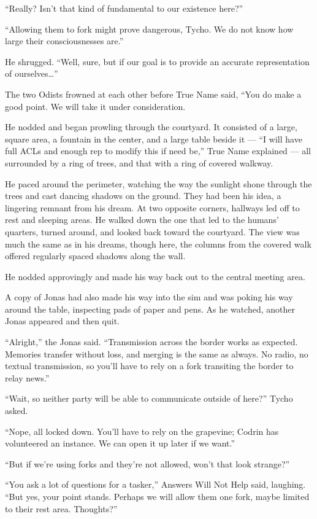 ``Really? Isn't that kind of fundamental to our existence here?''

``Allowing them to fork might prove dangerous, Tycho. We do not know how large their consciousnesses are.''

He shrugged. ``Well, sure, but if our goal is to provide an accurate representation of ourselves\ldots{}''

The two Odists frowned at each other before True Name said, ``You do make a good point. We will take it under consideration.

He nodded and began prowling through the courtyard. It consisted of a large, square area, a fountain in the center, and a large table beside it — ``I will have full ACLs and enough rep to modify this if need be,'' True Name explained — all surrounded by a ring of trees, and that with a ring of covered walkway.

He paced around the perimeter, watching the way the sunlight shone through the trees and cast dancing shadows on the ground. They had been his idea, a lingering remnant from his dream. At two opposite corners, hallways led off to rest and sleeping areas. He walked down the one that led to the humans' quarters, turned around, and looked back toward the courtyard. The view was much the same as in his dreams, though here, the columns from the covered walk offered regularly spaced shadows along the wall.

He nodded approvingly and made his way back out to the central meeting area.

A copy of Jonas had also made his way into the sim and was poking his way around the table, inspecting pads of paper and pens. As he watched, another Jonas appeared and then quit.

``Alright,'' the Jonas said. ``Transmission across the border works as expected. Memories transfer without loss, and merging is the same as always. No radio, no textual transmission, so you'll have to rely on a fork transiting the border to relay news.''

``Wait, so neither party will be able to communicate outside of here?'' Tycho asked.

``Nope, all locked down. You'll have to rely on the grapevine; Codrin has volunteered an instance. We can open it up later if we want.''

``But if we're using forks and they're not allowed, won't that look strange?''

``You ask a lot of questions for a tasker,'' Answers Will Not Help said, laughing. ``But yes, your point stands. Perhaps we will allow them one fork, maybe limited to their rest area. Thoughts?''

